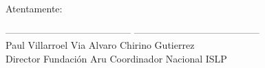 \documentclass[11pt,a4paper]{article}
\begin{document}
Atentamente:


\begin{center}
\vspace{2cm}
---------------------------------------\hspace{0.5cm} ---------------------------------------\\
\noindent \hspace{0.2cm}Paul Villarroel Via \hspace{2.5cm}				Alvaro Chirino Gutierrez\\
\hspace{0.5cm}Director Fundación Aru \hspace{1.7cm}	Coordinador Nacional ISLP

\end{center}
\end{document}
